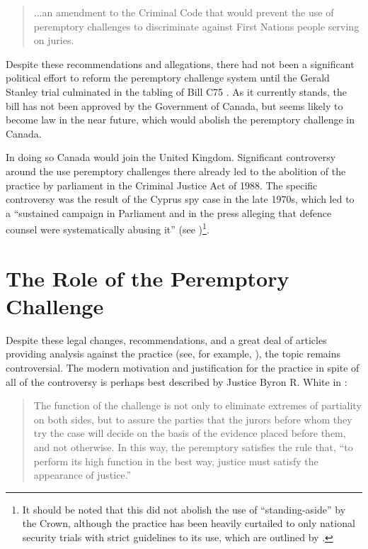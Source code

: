 \begin{quote}
  \centering
  ...an amendment to the Criminal Code that would prevent the use of peremptory challenges to discriminate against First Nations
  people serving on juries.
\end{quote}

Despite these recommendations and allegations, there had not been a significant political effort to reform the peremptory
challenge system until the Gerald Stanley trial culminated in the tabling of Bill C75 \cite{c75legisinfo}. As it currently stands,
the bill has not been approved by the Government of Canada, but seems likely to become law in the near future, which would abolish
the peremptory challenge in Canada.

In doing so Canada would join the United Kingdom. Significant controversy around the use peremptory challenges there already led
to the abolition of the practice by parliament in the Criminal Justice Act of 1988. The specific controversy was the result of the
Cyprus spy case in the late 1970s, which led to a ``sustained campaign in Parliament and in the press alleging that defence
counsel were systematically abusing it'' (see \cite{hoffman1997})\footnote{It should be noted that this did not abolish the use of
  ``standing-aside'' by the Crown, although the practice has been heavily curtailed to only national security trials with strict
  guidelines to its use, which are outlined by \cite{attgenguide}.}.

\section{The Role of the Peremptory Challenge} \label{sec:roleper}

Despite these legal changes, recommendations, and a great deal of articles providing analysis against the practice (see, for
example, \cite{hoffman1997}), the topic remains controversial. The modern motivation and justification for the practice in spite
of all of the controversy is perhaps best described by Justice Byron R. White in \cite{swainvalabama}:

\begin{quote}
\centering
The function of the challenge is not only to eliminate extremes of partiality on both sides, but to assure the parties that the
jurors before whom they try the case will decide on the basis of the evidence placed before them, and not otherwise. In this way,
the peremptory satisfies the rule that, ``to perform its high function in the best way, justice must satisfy the appearance of
justice.''
\end{quote}

